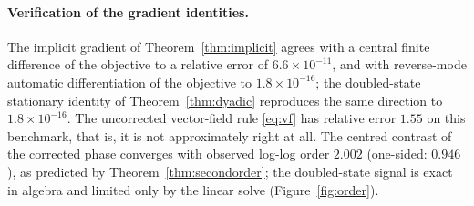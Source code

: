 \documentclass[11pt]{article}
\theoremstyle{definition}
\theoremstyle{remark}
\begin{document}
\paragraph{Verification of the gradient identities.}
The implicit gradient of Theorem~\ref{thm:implicit} agrees with a central finite difference of the
objective to a relative error of $6.6\times10^{-11}$, and with reverse-mode automatic
differentiation of the objective to $1.8\times10^{-16}$; the doubled-state stationary identity of
Theorem~\ref{thm:dyadic} reproduces the same direction to $1.8\times10^{-16}$. The uncorrected
vector-field rule \eqref{eq:vf} has relative error $1.55$ on this benchmark, that is, it is not
approximately right at all. The centred contrast of the corrected phase converges with observed
log-log order $2.002$ (one-sided: $0.946$), as predicted by Theorem~\ref{thm:secondorder}; the
doubled-state signal is exact in algebra and limited only by the linear solve
(Figure~\ref{fig:order}).
\end{document}

